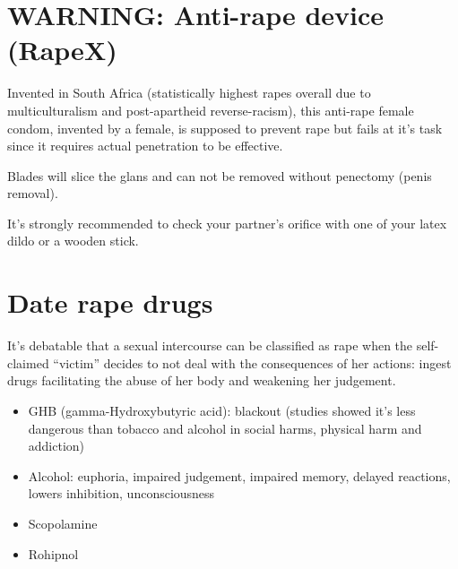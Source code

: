 \section*{WARNING: Anti-rape device (RapeX)}

Invented in South Africa (statistically highest rapes overall due to 
multiculturalism and post-apartheid reverse-racism), this anti-rape female 
condom, invented by a female, is supposed to prevent rape but fails at it’s task 
since it requires actual penetration to be effective.


Blades will slice the glans and can not be removed without penectomy (penis 
removal).


It’s strongly recommended to check your partner’s orifice with one of your latex 
dildo or a wooden stick.




\section*{Date rape drugs}

It’s debatable that a sexual intercourse can be classified as rape when the 
self-claimed “victim” decides to not deal with the consequences of her actions: 
ingest drugs facilitating the abuse of her body and weakening her judgement.
\begin{itemize}
\item GHB (gamma-Hydroxybutyric acid): blackout (studies showed it’s less dangerous 
than tobacco and alcohol in social harms, physical harm and addiction)

\item Alcohol: euphoria, impaired judgement, impaired memory, delayed reactions, 
lowers inhibition, unconsciousness

\item Scopolamine
\item Rohipnol
\end{itemize}
